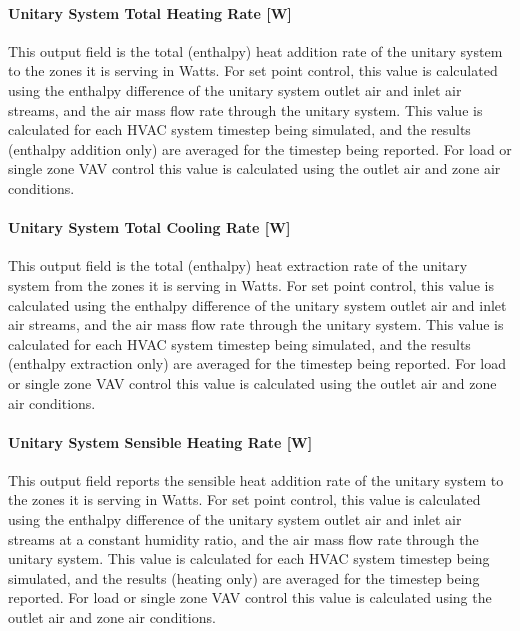 \paragraph{Unitary System Total Heating Rate {[}W{]}}\label{unitary-system-total-heating-rate-w}

This output field is the total (enthalpy) heat addition rate of the unitary system to the zones it is serving in Watts. For set point control, this value is calculated using the enthalpy difference of the unitary system outlet air and inlet air streams, and the air mass flow rate through the unitary system. This value is calculated for each HVAC system timestep being simulated, and the results (enthalpy addition only) are averaged for the timestep being reported. For load or single zone VAV control this value is calculated using the outlet air and zone air conditions.

\paragraph{Unitary System Total Cooling Rate {[}W{]}}\label{unitary-system-total-cooling-rate-w}

This output field is the total (enthalpy) heat extraction rate of the unitary system from the zones it is serving in Watts. For set point control, this value is calculated using the enthalpy difference of the unitary system outlet air and inlet air streams, and the air mass flow rate through the unitary system. This value is calculated for each HVAC system timestep being simulated, and the results (enthalpy extraction only) are averaged for the timestep being reported. For load or single zone VAV control this value is calculated using the outlet air and zone air conditions.

\paragraph{Unitary System Sensible Heating Rate {[}W{]}}\label{unitary-system-sensible-heating-rate-w}

This output field reports the sensible heat addition rate of the unitary system to the zones it is serving in Watts. For set point control, this value is calculated using the enthalpy difference of the unitary system outlet air and inlet air streams at a constant humidity ratio, and the air mass flow rate through the unitary system. This value is calculated for each HVAC system timestep being simulated, and the results (heating only) are averaged for the timestep being reported. For load or single zone VAV control this value is calculated using the outlet air and zone air conditions.


